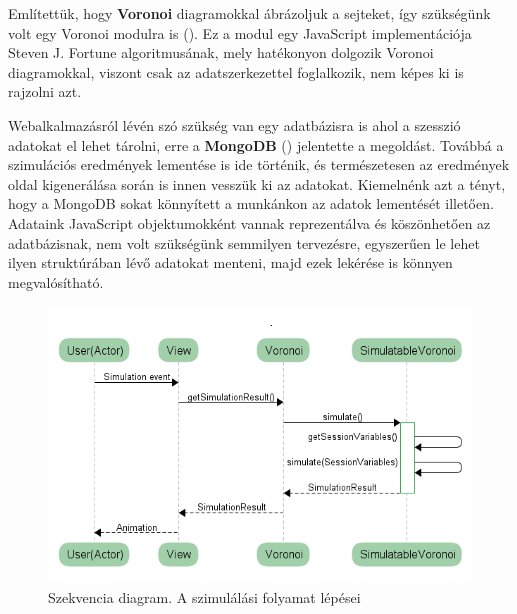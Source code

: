 Említettük, hogy \textbf{Voronoi} diagramokkal ábrázoljuk a sejteket, így szükségünk volt egy Voronoi modulra is (\cite{soft:voronoiModule}). Ez a modul egy JavaScript implementációja Steven J. Fortune algoritmusának, mely hatékonyon dolgozik Voronoi diagramokkal, viszont csak az adatszerkezettel foglalkozik, nem képes ki is rajzolni azt.

Webalkalmazásról lévén szó szükség van egy adatbázisra is ahol a szesszió adatokat el lehet tárolni, erre a \textbf{MongoDB} (\cite{soft:mongodb}) jelentette a megoldást. Továbbá a szimulációs eredmények lementése is ide történik, és természetesen az eredmények oldal kigenerálása során is innen vesszük ki az adatokat. Kiemelnénk azt a tényt, hogy a MongoDB sokat könnyített a munkánkon az adatok lementését illetően. Adataink JavaScript objektumokként vannak reprezentálva és köszönhetően az adatbázisnak, nem volt szükségünk semmilyen tervezésre, egyszerűen le lehet ilyen struktúrában lévő adatokat menteni, majd ezek lekérése is könnyen megvalósítható.

\begin{figure}[ht!]
	\centering
	\includegraphics[width=\linewidth]{images/SimulationProcess}
	\caption{Szekvencia diagram. A szimulálási folyamat lépései}
	\label{fig:SimulationProcess}
\end{figure}

